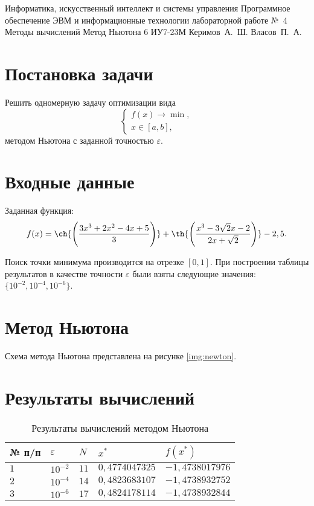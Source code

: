 \documentclass{bmstu-gost-7-32}
\begin{document}
\makereporttitle
	{Информатика, искусственный интеллект и системы управления} %
	{Программное обеспечение ЭВМ и информационные технологии} %
	{лабораторной работе №~4} %
	{Методы вычислений} %
	{Метод Ньютона} %
	{6} %
	{ИУ7-23М} %
	{Керимов~А.~Ш.} %
	{Власов~П.~А.} %

\section*{Постановка задачи}

Решить одномерную задачу оптимизации вида
\begin{equation}
	\begin{cases}
		f(x) \to \min, \\
		x \in [a, b],
	\end{cases}
\end{equation}
методом Ньютона с заданной точностью $\varepsilon$.

\section*{Входные данные}

Заданная функция:
\begin{equation}
	f(x) = \ch{\left(\frac{3x^3 + 2x^2 - 4x + 5}{3}\right)} + \th{\left(\frac{x^3 - 3\sqrt2x - 2}{2x + \sqrt2}\right)} - 2,5.
\end{equation}

Поиск точки минимума производится на отрезке $[0, 1]$.
При построении таблицы результатов в качестве точности $\varepsilon$ были взяты следующие значения: $\{10^{-2}, 10^{-4}, 10^{-6}\}$.

\section*{Метод Ньютона}

Схема метода Ньютона представлена на рисунке \ref{img:newton}.


\section*{Результаты вычислений}

\begin{table}[H]
	\caption{Результаты вычислений методом Ньютона}
	\begin{tabular}{|l|l|l|l|l|}
		\hline
		№ п/п & $\varepsilon$ & $N$  & $x^*$          & $f(x^*)$        \\ \hline
		$1$   & $10^{-2}$     & $11$ & $0,4774047325$ & $-1,4738017976$ \\ \hline
		$2$   & $10^{-4}$     & $14$ & $0,4823683107$ & $-1,4738932752$ \\ \hline
		$3$   & $10^{-6}$     & $17$ & $0,4824178114$ & $-1,4738932844$ \\ \hline
	\end{tabular}
\end{table}
\end{document}
